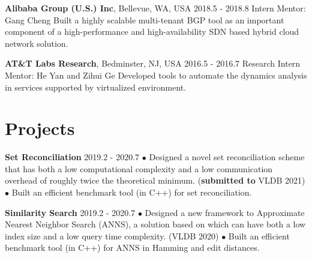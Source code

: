 \documentclass[line,11pt,letter]{includes/cls/myRes}
\begin{document}
\begin{resume}
{\setlength{\parskip}{0pt}
{\bf Alibaba Group (U.S.) Inc}, Bellevue, WA, USA \hfill 2018.5 - 2018.8\break
{\hspace*{1em} Intern \hfill Mentor: Gang Cheng\break}
{\hspace*{1em} Built a highly scalable multi-tenant BGP tool as an important component of a high-performance and high-availability SDN based hybrid cloud network solution.  \hfill \phantom{for-alignment} \break}
}\sspace

{\setlength{\parskip}{0pt}
{\bf AT\&T Labs Research}, Bedminster, NJ, USA \hfill 2016.5 - 2016.7\break
{\hspace*{1em} Research Intern \hfill Mentor: He Yan and Zihui Ge\break}
{\hspace*{1em} Developed tools to automate the dynamics analysis in services supported by virtualized environment.\break}
}\negspace
\section{Projects}

\vspace{-4pt}
{\setlength{\parskip}{0pt}
{\bf Set Reconciliation} \hfill 2019.2 - 2020.7\break
{\hspace*{1em} $\bullet$ Designed a novel set reconciliation scheme that has both a low computational complexity and a low communication overhead of
roughly twice the theoretical minimum. ({\bf submitted to} VLDB 2021)\hfill\break}
{\hspace*{1em} $\bullet$ Built an efficient benchmark tool (in C++) for set reconciliation.\hfill\break}
\sspace
}

{\setlength{\parskip}{0pt}
{\bf Similarity Search} \hfill 2019.2 - 2020.7\break
{\hspace*{1em} $\bullet$ Designed a new framework to Approximate Nearest Neighbor Search (ANNS), a solution based on which can have both a low index size and a low query time complexity. (VLDB 2020)\hfill\break}
{\hspace*{1em} $\bullet$ Built an efficient benchmark tool (in C++) for ANNS in Hamming and edit distances.\hfill\break}
\sspace
}


\end{resume}
\end{document}
